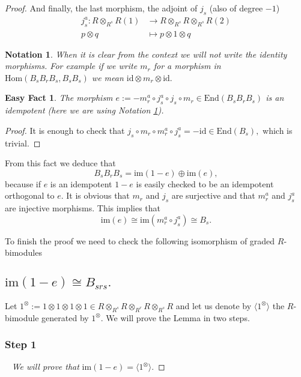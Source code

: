 \documentclass[12pt]{wart}
\newtheorem{nota}[thm]{Notation}
\newtheorem{ef}[thm]{Easy Fact}
\theoremstyle{remark}
\begin{document}
\begin{proof}
And finally, the last morphism, the adjoint of $j_s$ (also of degree $-1$)
\begin{align*}
j_s^a: R\otimes_{R^s}R(1)  & \rightarrow   R\otimes_{R^s}R\otimes_{R^s}R(2)\\
p\otimes q & \mapsto p\otimes 1\otimes q
\end{align*}

\begin{nota}\label{cucu}
When it is clear from the context we will not write the identity morphisms. For example if we write $m_r$ for a morphism in $\mathrm{Hom}(B_sB_rB_s,B_sB_s)$ we mean $\mathrm{id}\otimes m_r\otimes \mathrm{id}.$ 
\end{nota}

\begin{ef}
The morphism $e:=   - m_r^a \circ j_s^a\circ j_s\circ m_r\in \mathrm{End}(B_sB_rB_s)$ is an idempotent (here we are using Notation \ref{cucu}).
\end{ef}
\begin{proof}
It is enough to check that $j_s\circ m_r\circ m_r^a \circ j_s^a=-\mathrm{id}\in \mathrm{End}(B_s),$ which is trivial. 
\end{proof}
From this fact we deduce that 
\begin{equation}\label{e}B_sB_rB_s=\mathrm{im}(1-e)\oplus \mathrm{im}(e),\end{equation} because if $e$ is an idempotent $1-e$ is easily checked to be an idempotent orthogonal to $e$. It is obvious that $m_r$ and $j_s$ are surjective and that $m_r^a$ and $j_s^a$ are injective morphisms. This implies that $$\mathrm{im}(e)\cong \mathrm{im}(m_r^a \circ j_s^a)\cong B_s.$$

To finish the proof we need to check the following isomorphism of graded $R$-bimodules
\subsection{$\mathrm{im}(1-e)\cong B_{srs}.$}\label{achi}
 
Let $1^{\otimes}:=1\otimes 1\otimes 1\otimes 1\in R\otimes_{R^s}R\otimes_{R^r}R\otimes_{R^s}R$
and let us denote  by $\langle 1^{\otimes} \rangle$   the $R$-bimodule generated by    $1^{\otimes}$.
We will prove the Lemma in two steps. 


\subsubsection{Step 1}\ \textit{ We will prove that }$\mathrm{im}(1-e)= \langle 1^{\otimes} \rangle$.



\end{proof}
\end{document}
